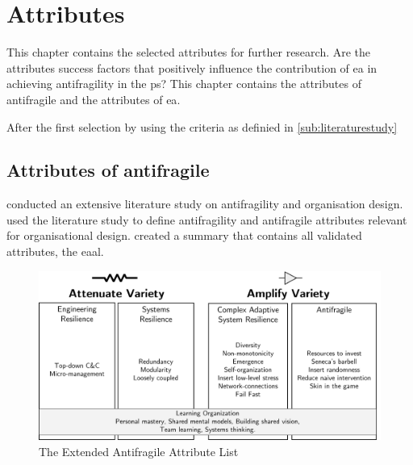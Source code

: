 \chapter{Attributes}
\label{ch:attributes}
This chapter contains the selected \glspl{attribute} for further research. Are the \glspl{attribute} success factors that positively influence the contribution of \acrlong{ea} in achieving \gls{antifragility} in the \gls{ps}? This chapter contains the attributes of \gls{antifragile} and the attributes of \acrlong{ea}. 

After the first selection by using the criteria as definied in \cref{sub:literaturestudy}
\section{Attributes of antifragile}
\label{sec:attributesantifragile}
\label{sub:attributeseaal}
\textcites{Botjes2020}{Botjes2021} conducted an extensive literature study on \gls{antifragility} and organisation design. \textcites{Botjes2020}{Botjes2021} used the literature study to define \gls{antifragility} and \gls{antifragile} \glspl{attribute} relevant for organisational design. \textcite[Fig.~8]{Botjes2021} created a summary that contains all validated attributes, the \acrlong{eaal}.
\begin{figure}[H]
	\centering
	\includegraphics[width=0.8\linewidth]{images/eaalbw}
	\caption[The Extended Antifragile Attribute List \parencite{Botjes2021}]{The Extended Antifragile Attribute List \parencite{Botjes2021}}
	\label{fig:eaalbw}
\end{figure}
